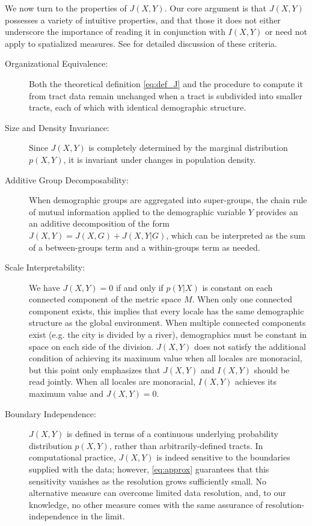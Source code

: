 	We now turn to the properties of $J(X,Y)$. Our core argument is that $J(X,Y)$ possesses a variety of intuitive properties, and that those it does not either underscore the importance of reading it in conjunction with $I(X,Y)$ or need not apply to spatialized measures.  See \cite{Reardon2002,Reardon2004} for detailed discussion of these criteria. 
	\begin{description}
		\item[Organizational Equivalence:] Both the theoretical definition \eqref{eq:def_J} and the procedure to compute it from tract data remain unchanged when a tract is subdivided into smaller tracts, each of which with identical demographic structure. 
		\item[Size and Density Invariance:] Since $J(X,Y)$ is completely determined by the marginal distribution $p(X,Y)$, it is invariant under changes in population density. 
		\item[Additive Group Decomposability:] When demographic groups are aggregated into super-groups, the chain rule of mutual information applied to the demographic variable $Y$ provides an an additive decomposition of the form $J(X,Y) = J(X,G) + J(X,Y|G)$, which can be interpreted as the sum of a between-groups term and a within-groups term as needed.
		\item[Scale Interpretability:] We have $J(X,Y) = 0$ if and only if $p(Y|X)$ is constant on each connected component of the metric space $M$. When only one connected component exists, this implies that every locale has the same demographic structure as the global environment. When multiple connected components exist (e.g. the city is divided by a river), demographics must be constant in space on each side of the division. $J(X,Y)$ does not satisfy the additional condition of achieving its maximum value when all locales are monoracial, but this point only emphasizes that $J(X,Y)$ and $I(X,Y)$ should be read jointly. When all locales are monoracial, $I(X,Y)$ achieves its maximum value and $J(X,Y) = 0$. 
		\item[Boundary Independence:] $J(X,Y)$ is defined in terms of a continuous underlying probability distribution $p(X,Y)$, rather than arbitrarily-defined tracts. In computational practice, $J(X,Y)$ is indeed sensitive to the boundaries supplied with the data; however, \eqref{eq:approx} guarantees that this sensitivity vanishes as the resolution grows sufficiently small. No alternative measure can overcome limited data resolution, and, to our knowledge, no other measure comes with the same assurance of resolution-independence in the limit. 

\end{description}
